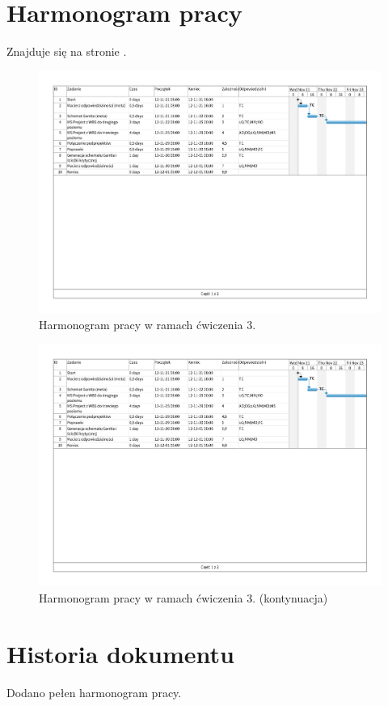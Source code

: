 \documentclass[10pt]{dokument-ppi}
\begin{document}
\Meta
{}
\MakeDokumentMeta


\section{Harmonogram pracy}

Znajduje się na stronie \pageref{fig:harmonogram}.

\begin{figure}[p]
    \includegraphics[trim=1.23cm 1.23cm 1.23cm 1.23cm,page=1,angle=270,width=\textwidth]{./figury/harmonogram}
    \caption{Harmonogram pracy w ramach ćwiczenia 3.}
    \label{fig:harmonogram}
\end{figure}

\begin{figure}[p]
    \ContinuedFloat
    \includegraphics[trim=1.23cm 1.23cm 1.23cm 1.23cm,page=2,angle=270,width=\textwidth]{./figury/harmonogram}
    \caption[]{Harmonogram pracy w ramach ćwiczenia 3. (kontynuacja)}
\end{figure}


\section{Historia dokumentu}
\begin{versions}
        Dodano pełen harmonogram pracy.
\end{versions}
\end{document}
